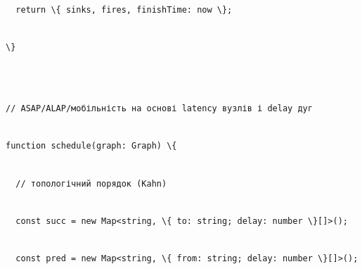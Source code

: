 \documentclass[
]{article}
\newcommand{\passthrough}[1]{#1}
\begin{document}
\passthrough{\lstinline!  !}\passthrough{\lstinline!return!}\passthrough{\lstinline! !}\passthrough{\lstinline!\{!}\passthrough{\lstinline! !}\passthrough{\lstinline!sinks,!}\passthrough{\lstinline! !}\passthrough{\lstinline!fires,!}\passthrough{\lstinline! !}\passthrough{\lstinline!finishTime!}\passthrough{\lstinline!:!}\passthrough{\lstinline! !}\passthrough{\lstinline!now!}\passthrough{\lstinline! !}\passthrough{\lstinline!\};!}\strut \\
\passthrough{\lstinline!\}!}\strut \\
\strut \\
\passthrough{\lstinline!//!}\passthrough{\lstinline! !}\passthrough{\lstinline!ASAP/ALAP/!}\passthrough{\lstinline!мобільність!}\passthrough{\lstinline! !}\passthrough{\lstinline!на!}\passthrough{\lstinline! !}\passthrough{\lstinline!основі!}\passthrough{\lstinline! !}\passthrough{\lstinline!latency!}\passthrough{\lstinline! !}\passthrough{\lstinline!вузлів!}\passthrough{\lstinline! !}\passthrough{\lstinline!і!}\passthrough{\lstinline! !}\passthrough{\lstinline!delay!}\passthrough{\lstinline! !}\passthrough{\lstinline!дуг!}\strut \\
\passthrough{\lstinline!function!}\passthrough{\lstinline! !}\passthrough{\lstinline!schedule(graph:!}\passthrough{\lstinline! !}\passthrough{\lstinline!Graph)!}\passthrough{\lstinline! !}\passthrough{\lstinline!\{!}\strut \\
\passthrough{\lstinline!  !}\passthrough{\lstinline!//!}\passthrough{\lstinline! !}\passthrough{\lstinline!топологічний!}\passthrough{\lstinline! !}\passthrough{\lstinline!порядок!}\passthrough{\lstinline! !}\passthrough{\lstinline!(Kahn)!}\strut \\
\passthrough{\lstinline!  !}\passthrough{\lstinline!const!}\passthrough{\lstinline! !}\passthrough{\lstinline!succ!}\passthrough{\lstinline! !}\passthrough{\lstinline!=!}\passthrough{\lstinline! !}\passthrough{\lstinline!new!}\passthrough{\lstinline! !}\passthrough{\lstinline!Map<string,!}\passthrough{\lstinline! !}\passthrough{\lstinline!\{!}\passthrough{\lstinline! !}\passthrough{\lstinline!to:!}\passthrough{\lstinline! !}\passthrough{\lstinline!string;!}\passthrough{\lstinline! !}\passthrough{\lstinline!delay:!}\passthrough{\lstinline! !}\passthrough{\lstinline!number!}\passthrough{\lstinline! !}\passthrough{\lstinline!\}[]>();!}\strut \\
\passthrough{\lstinline!  !}\passthrough{\lstinline!const!}\passthrough{\lstinline! !}\passthrough{\lstinline!pred!}\passthrough{\lstinline! !}\passthrough{\lstinline!=!}\passthrough{\lstinline! !}\passthrough{\lstinline!new!}\passthrough{\lstinline! !}\passthrough{\lstinline!Map<string,!}\passthrough{\lstinline! !}\passthrough{\lstinline!\{!}\passthrough{\lstinline! !}\passthrough{\lstinline!from:!}\passthrough{\lstinline! !}\passthrough{\lstinline!string;!}\passthrough{\lstinline! !}\passthrough{\lstinline!delay:!}\passthrough{\lstinline! !}\passthrough{\lstinline!number!}\passthrough{\lstinline! !}\passthrough{\lstinline!\}[]>();!}\strut \\
\end{document}
